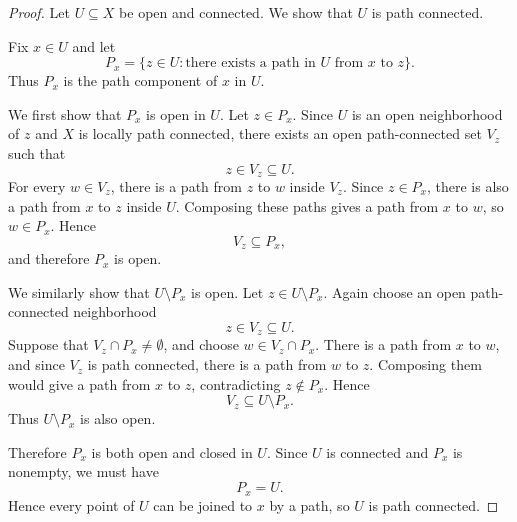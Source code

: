 \documentclass[11pt]{article}
\begin{document}
\begin{proof}
Let $U\subseteq X$ be open and connected. We show that
$U$ is path connected.

Fix $x\in U$ and let
\[
    P_x
    =
    \{z\in U : \text{there exists a path in $U$ from $x$ to $z$}\}.
\]
Thus $P_x$ is the path component of $x$ in $U$.

We first show that $P_x$ is open in $U$. Let $z\in P_x$.
Since $U$ is an open neighborhood of $z$ and $X$ is locally
path connected, there exists an open path-connected set
$V_z$ such that
\[
    z\in V_z\subseteq U.
\]
For every $w\in V_z$, there is a path from $z$ to $w$ inside
$V_z$. Since $z\in P_x$, there is also a path from $x$ to $z$
inside $U$. Composing these paths gives a path from $x$ to $w$,
so $w\in P_x$. Hence
\[
    V_z\subseteq P_x,
\]
and therefore $P_x$ is open.

We similarly show that $U\setminus P_x$ is open. Let
$z\in U\setminus P_x$. Again choose an open path-connected
neighborhood
\[
    z\in V_z\subseteq U.
\]
Suppose that $V_z\cap P_x\neq\emptyset$, and choose
$w\in V_z\cap P_x$. There is a path from $x$ to $w$, and since
$V_z$ is path connected, there is a path from $w$ to $z$.
Composing them would give a path from $x$ to $z$, contradicting
$z\notin P_x$. Hence
\[
    V_z\subseteq U\setminus P_x.
\]
Thus $U\setminus P_x$ is also open.

Therefore $P_x$ is both open and closed in $U$. Since $U$ is
connected and $P_x$ is nonempty, we must have
\[
    P_x=U.
\]
Hence every point of $U$ can be joined to $x$ by a path, so
$U$ is path connected.

\end{proof}
\end{document}
